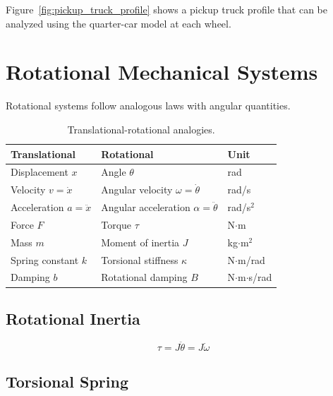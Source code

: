 Figure~\ref{fig:pickup_truck_profile} shows a pickup truck profile that can be analyzed using the quarter-car model at each wheel.



\section{Rotational Mechanical Systems}
\label{sec:rotational}

Rotational systems follow analogous laws with angular quantities.

\begin{table}[htbp]
\centering
\begin{tabular}{lll}
\toprule
\textbf{Translational} & \textbf{Rotational} & \textbf{Unit} \\
\midrule
Displacement $x$ & Angle $\theta$ & rad \\
Velocity $v = \dot{x}$ & Angular velocity $\omega = \dot{\theta}$ & rad/s \\
Acceleration $a = \ddot{x}$ & Angular acceleration $\alpha = \ddot{\theta}$ & rad/s$^2$ \\
Force $F$ & Torque $\tau$ & N$\cdot$m \\
Mass $m$ & Moment of inertia $J$ & kg$\cdot$m$^2$ \\
Spring constant $k$ & Torsional stiffness $\kappa$ & N$\cdot$m/rad \\
Damping $b$ & Rotational damping $B$ & N$\cdot$m$\cdot$s/rad \\
\bottomrule
\end{tabular}
\caption{Translational-rotational analogies.}
\label{tab:rot_analogies}
\end{table}

\subsection{Rotational Inertia}

\begin{equation}
\tau = J\ddot{\theta} = J\dot{\omega}
\end{equation}

\subsection{Torsional Spring}

